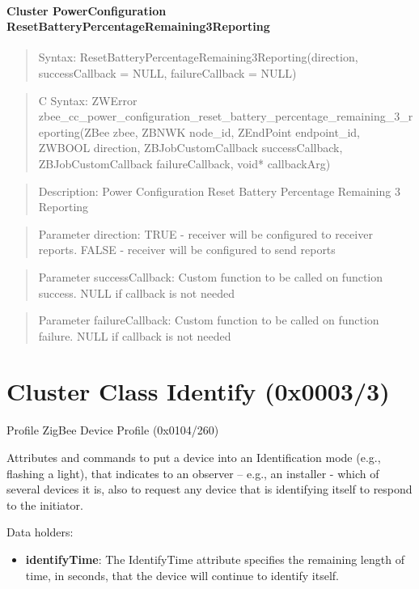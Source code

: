 \paragraph{Cluster PowerConfiguration ResetBatteryPercentageRemaining3Reporting}
\begin{quote}Syntax: ResetBatteryPercentageRemaining3Reporting(direction, successCallback = NULL, failureCallback = NULL)\end{quote}
\begin{quote}C Syntax: ZWError zbee\_cc\_power\_configuration\_reset\_battery\_percentage\_remaining\_3\_reporting(ZBee zbee, ZBNWK node\_id, ZEndPoint endpoint\_id, ZWBOOL direction, ZBJobCustomCallback successCallback, ZBJobCustomCallback failureCallback, void* callbackArg)\end{quote}
\begin{quote}Description: Power Configuration Reset Battery Percentage Remaining 3 Reporting\end{quote}
\begin{quote}Parameter direction: TRUE  - receiver will be configured to receiver reports. FALSE - receiver will be configured to send reports\end{quote}
\begin{quote}Parameter successCallback: Custom function to be called on function success. NULL if callback is not needed\end{quote}
\begin{quote}Parameter failureCallback: Custom function to be called on function failure. NULL if callback is not needed\end{quote}



\section{Cluster Class Identify (0x0003/3)}

Profile ZigBee Device Profile (0x0104/260)

Attributes and commands to put a device into an Identification mode (e.g., flashing a light), that indicates to an observer – e.g., an installer - which of several devices it is, also to request any device that is identifying itself to respond to the initiator.
\newline

\noindent
Data holders:

\begin{itemize}
\item \textbf{identifyTime}: The IdentifyTime attribute specifies the remaining length of time, in seconds, that the device will continue to identify itself.
\end{itemize}

